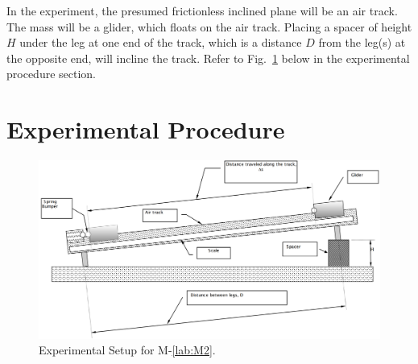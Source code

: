 In the experiment, the presumed frictionless inclined plane will be an air track.  The mass will be a glider, which floats on the air track.  Placing a spacer of height $H$ under the leg at one end of the track, which is a distance $D$ from the leg(s) at the opposite end, will incline the track.  Refer to Fig.~\ref{M02Fig02} below in the experimental procedure section.


















\section{Experimental Procedure}

\begin{figure}[ht]
  \begin{center}
    \includegraphics[width=5.8in]{Fall/Experiment02Figures/M02_fig2.png}
  \end{center}
  \caption{Experimental Setup for M-\ref{lab:M2}.}
  \label{M02Fig02}
\end{figure}

